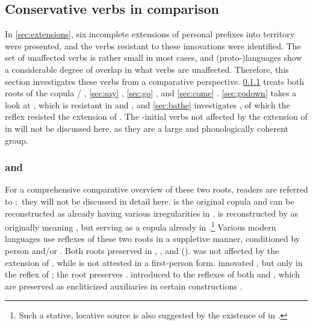 \subsection{Conservative verbs in comparison}
\label{sec:verbs}
In \cref{sec:extensions}, six incomplete extensions of personal prefixes into  territory were presented, and the verbs resistant to these innovations were identified.
The set of unaffected verbs is rather small in most cases, and (proto-)languages show a considerable degree of overlap in what verbs are unaffected.
Therefore, this section investigates these verbs from a comparative perspective.
\cref{sec:be} treats both roots of the copula / , \cref{sec:say}  , \cref{sec:go}  , and \cref{sec:come}  .
\cref{sec:godown} takes a look at  , which is resistant in \PTir and \PPek, and  \cref{sec:bathe} investigates  , of which the \PPek reflex  resisted the extension of .
The -initial verbs not affected by the extension of  in \akuriyo {} will not be discussed here, as they are a large and phonologically coherent group.

\subsubsection{ and  }
\label{sec:be}
For a comprehensive comparative overview of these two roots, readers are referred to \textcite[375--382]{gildea2018reconstructing}; they will not be discussed in detail here.
 is the original copula and can be reconstructed as already having various irregularities in \PC.
 is reconstructed by \textcites{meira2009property}{gildea2018reconstructing} as originally meaning , but serving as a copula already in \PC.\footnote{Such a stative, locative source is also suggested by the existence of   in \arara \parencite[196]{alves2017arara}.}
Various modern languages use reflexes of these two roots in a suppletive manner, conditioned by person and\slash{}or .
Both roots preserved   in \PPek, \PWai, and \PTir ().
\akuriyo {} was not affected by the extension of  , while  is not attested in a first-person form. 
\carijo innovated , but only in the reflex of  ; the  root preserves  .
\yukpa introduced  to the reflexes of both  and , which are preserved as encliticized auxiliaries in certain constructions .

